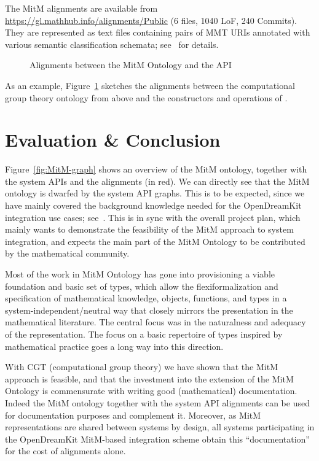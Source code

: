 \documentclass{deliverablereport}
\begin{document}
The MitM alignments are available from \url{https://gl.mathhub.info/alignments/Public} (6
files, 1040 LoF, 240 Commits). They are represented as text files containing pairs of MMT
URIs annotated with various semantic classification schemata;
see~\cite{MueGauKal:cacfms17} for details.
\begin{figure}[ht]\centering
  \caption{Alignments between the MitM Ontology and the \GAP API}\label{fig:cgtontology}
\end{figure}

As an example, Figure~\ref{fig:cgtontology} sketches the alignments between the
computational group theory ontology from above and the constructors and operations of
\GAP.

\section{Evaluation \& Conclusion}\label{sec:concl}

Figure~\ref{fig:MitM-graph} shows an overview of the MitM ontology, together with the
system APIs and the alignments (in red). We can directly see that the MitM ontology is
dwarfed by the system API graphs. This is to be expected, since we have mainly covered the
background knowledge needed for the OpenDreamKit integration use cases;
see~\cite{ODK-D6.5}. This is in sync with the overall project plan, which mainly wants to
demonstrate the feasibility of the MitM approach to system integration, and expects the
main part of the MitM Ontology to be contributed by the mathematical community.

Most of the work in MitM Ontology has gone into provisioning a viable foundation
and basic set of types, which allow the flexiformalization and specification of
mathematical knowledge, objects, functions, and types in a system-independent/neutral way
that closely mirrors the presentation in the mathematical literature. The central focus
was in the naturalness and adequacy of the representation. The focus on a basic repertoire
of types inspired by mathematical practice goes a long way into this direction.

With CGT (computational group theory) we have shown that the MitM approach is feasible,
and that the investment into the extension of the MitM Ontology is commensurate with
writing good (mathematical) documentation. Indeed the MitM ontology together with the
system API alignments can be used for documentation purposes and complement it. Moreover, as
MitM representations are shared between systems by design, all systems participating in
the OpenDreamKit MitM-based integration scheme obtain this ``documentation'' for the cost
of alignments alone. 
\end{document}
